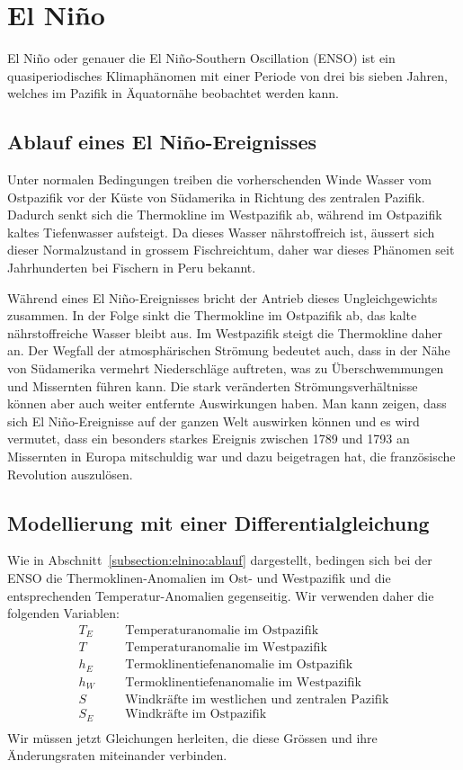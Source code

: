 %
%
%
\section{El Niño\label{section:elnino}}
El Niño oder genauer die El Niño-Southern Oscillation (ENSO) ist ein
quasiperiodisches Klimaphänomen mit einer Periode von drei bis sieben
Jahren, welches im Pazifik in Äquatornähe beobachtet werden kann.

\subsection{Ablauf eines El Niño-Ereignisses\label{subsection:elnino:ablauf}}
Unter normalen Bedingungen treiben die vorherschenden Winde Wasser vom
Ostpazifik vor der Küste von Südamerika in Richtung des zentralen Pazifik.
Dadurch senkt sich die Thermokline im Westpazifik ab, während im 
Ostpazifik kaltes Tiefenwasser aufsteigt.
Da dieses Wasser nährstoffreich ist, äussert sich dieser Normalzustand
in grossem Fischreichtum, daher war dieses Phänomen seit Jahrhunderten
bei Fischern in Peru bekannt.

Während eines El Niño-Ereignisses bricht der Antrieb dieses Ungleichgewichts
zusammen.
In der Folge sinkt die Thermokline im Ostpazifik ab, das kalte nährstoffreiche
Wasser bleibt aus.
Im Westpazifik steigt die Thermokline daher an.
Der Wegfall der atmosphärischen Strömung bedeutet auch, dass in der Nähe
von Südamerika vermehrt Niederschläge auftreten, was zu Überschwemmungen
und Missernten führen kann.
Die stark veränderten Strömungsverhältnisse können aber auch weiter entfernte
Auswirkungen haben.
Man kann zeigen, dass sich El Niño-Ereignisse auf der ganzen Welt auswirken
können und es wird vermutet, dass ein besonders starkes Ereignis zwischen
1789 und 1793 an Missernten in Europa mitschuldig war und dazu beigetragen
hat, die französische Revolution auszulösen.

\subsection{Modellierung mit einer Differentialgleichung%
\label{subsection:elnino:modellierung}}
Wie in Abschnitt~\ref{subsection:elnino:ablauf} dargestellt, bedingen sich
bei der ENSO die Thermoklinen-Anomalien im Ost- und Westpazifik und die
entsprechenden Temperatur-Anomalien gegenseitig.
Wir verwenden daher die folgenden Variablen:
\[
\begin{aligned}
T_E&&&\text{Temperaturanomalie im Ostpazifik}\\
T&&&\text{Temperaturanomalie im Westpazifik}\\
h_E&&&\text{Termoklinentiefenanomalie im Ostpazifik}\\
h_W&&&\text{Termoklinentiefenanomalie im Westpazifik}\\
S&&&\text{Windkräfte im westlichen und zentralen Pazifik}\\
S_E&&&\text{Windkräfte im Ostpazifik}\\
\end{aligned}
\]
Wir müssen jetzt Gleichungen herleiten, die diese Grössen und ihre
Änderungsraten miteinander verbinden.

